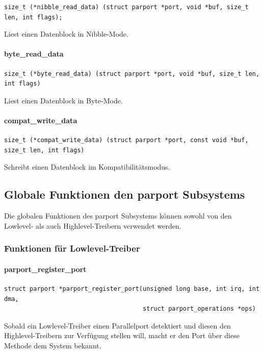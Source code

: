 \documentclass[a4paper,11pt]{article}
\begin{document}
\begin{verbatim}
size_t (*nibble_read_data) (struct parport *port, void *buf, size_t len, int flags);
\end{verbatim}

Liest einen Datenblock in Nibble-Mode.

\paragraph{byte\_read\_data}

\begin{verbatim}
size_t (*byte_read_data) (struct parport *port, void *buf, size_t len, int flags)
\end{verbatim}

Liest einen Datenblock in Byte-Mode.

\paragraph{compat\_write\_data}

\begin{verbatim}
size_t (*compat_write_data) (struct parport *port, const void *buf, size_t len, int flags)
\end{verbatim}

Schreibt einen Datenblock im Kompatibilitätsmodus.

\subsection{Globale Funktionen den parport Subsystems}

Die globalen Funktionen des parport Subsystems können sowohl von den Lowlevel- als auch
Highlevel-Treibern verwendet werden.

\subsubsection{Funktionen für Lowlevel-Treiber}

\paragraph{parport\_register\_port}
\begin{verbatim}
struct parport *parport_register_port(unsigned long base, int irq, int dma, 
                                      struct parport_operations *ops)
\end{verbatim}

Sobald ein Lowlevel-Treiber einen Parallelport detektiert und diesen den Highlevel-Treibern zur
Verfügung stellen will, macht er den Port über diese Methode dem System bekannt.
\end{document}
